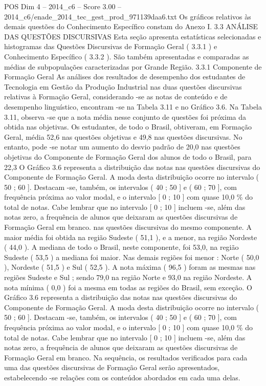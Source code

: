\begin{textsample}{POS Dim 4 – 2014\_c6 – Score 3.00 – 2014\_c6/enade\_2014\_tec\_gest\_prod\_971139daa6.txt}
Os gráficos relativos às demais questões do Conhecimento Específico constam do Anexo I. 3.3 ANÁLISE DAS QUESTÕES DISCURSIVAS Esta seção apresenta estatísticas selecionadas e histogramas das Questões Discursivas de Formação Geral ( 3.3.1 ) e Conhecimento Específico ( 3.3.2 ).
São também apresentadas e comparadas as médias de subpopulações caracterizadas por Grande Região. 3.3.1 Componente de Formação Geral As análises dos resultados de desempenho dos estudantes de Tecnologia em Gestão da Produção Industrial nas duas questões discursivas relativas à Formação Geral, considerando -se as notas de conteúdo e de desempenho linguístico, encontram -se na Tabela 3.11 e no Gráfico 3.6.
Na Tabela 3.11, observa -se que a nota média nesse conjunto de questões foi próxima da obtida nas objetivas.
Os estudantes, de todo o Brasil, obtiveram, em Formação Geral, média 52,6 nas questões objetivas e 49,8 nas questões discursivas.
No entanto, pode -se notar um aumento do desvio padrão de 20,0 nas questões objetivas do Componente de Formação Geral dos alunos de todo o Brasil, para 22,3 O Gráfico 3.6 representa a distribuição das notas nas questões discursivas do Componente de Formação Geral.
A moda desta distribuição ocorre no intervalo ( 50 ; 60 ].
Destacam -se, também, os intervalos ( 40 ; 50 ] e ( 60 ; 70 ], com frequência próxima ao valor modal, e o intervalo [ 0 ; 10 ] com quase 10,0 \% do total de notas.
Cabe lembrar que no intervalo [ 0 ; 10 ] incluem -se, além das notas zero, a frequência de alunos que deixaram as questões discursivas de Formação Geral em branco. nas questões discursivas do mesmo componente.
A maior média foi obtida na região Sudeste ( 51,1 ), e a menor, na região Nordeste ( 44,0 ).
A mediana de todo o Brasil, neste componente, foi 53,0, na região Sudeste ( 53,5 ) a mediana foi maior.
Nas demais regiões foi menor : Norte ( 50,0 ), Nordeste ( 51,5 ) e Sul ( 52,5 ).
A nota máxima ( 96,5 ) foram as mesmas nas regiões Sudeste e Sul ; sendo 79,0 na região Norte e 93,0 na região Nordeste.
A nota mínima ( 0,0 ) foi a mesma em todas as regiões do Brasil, sem exceção.
O Gráfico 3.6 representa a distribuição das notas nas questões discursivas do Componente de Formação Geral.
A moda desta distribuição ocorre no intervalo ( 50 ; 60 ].
Destacam -se, também, os intervalos ( 40 ; 50 ] e ( 60 ; 70 ], com frequência próxima ao valor modal, e o intervalo [ 0 ; 10 ] com quase 10,0 \% do total de notas.
Cabe lembrar que no intervalo [ 0 ; 10 ] incluem -se, além das notas zero, a frequência de alunos que deixaram as questões discursivas de Formação Geral em branco.
Na sequência, os resultados verificados para cada uma das questões discursivas de Formação Geral serão apresentados, estabelecendo -se relações com os conteúdos abordados em cada uma delas.

\end{textsample}
